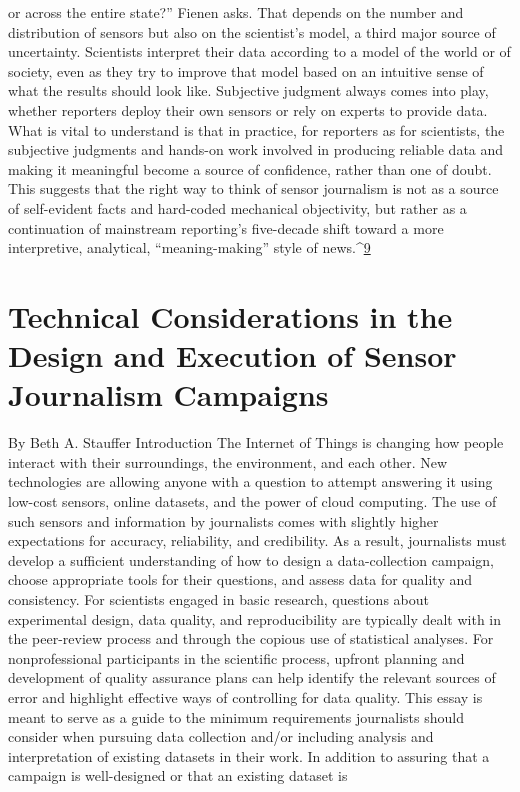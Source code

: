 or across the entire state?'' Fienen asks. That depends on the number and
distribution of sensors but also on the scientist's model, a third major source
of uncertainty. Scientists interpret their data according to a model of the
world or of society, even as they try to improve that model based on an
intuitive sense of what the results should look like.
Subjective judgment always comes into play, whether reporters deploy their
own sensors or rely on experts to provide data. What is vital to understand
is that in practice, for reporters as for scientists, the subjective judgments
and hands-on work involved in producing reliable data and making it meaningful
become a source of confidence, rather than one of doubt. This suggests
that the right way to think of sensor journalism is not as a source of
self-evident facts and hard-coded mechanical objectivity, but rather as a
continuation of mainstream reporting's five-decade shift toward a more
interpretive, analytical, ``meaning-making'' style of news.^{\href{#endnotes-graves}{9}}

\section{Technical Considerations in the Design and Execution of Sensor Journalism Campaigns}
By Beth A. Stauffer
Introduction
The Internet of Things is changing how people interact with their surroundings,
the environment, and each other. New technologies are allowing anyone
with a question to attempt answering it using low-cost sensors, online
datasets, and the power of cloud computing. The use of such sensors and
information by journalists comes with slightly higher expectations for accuracy,
reliability, and credibility. As a result, journalists must develop a sufficient
understanding of how to design a data-collection campaign, choose
appropriate tools for their questions, and assess data for quality and consistency.
For scientists engaged in basic research, questions about experimental
design, data quality, and reproducibility are typically dealt with in
the peer-review process and through the copious use of statistical analyses.
For nonprofessional participants in the scientific process, upfront planning
and development of quality assurance plans can help identify the relevant
sources of error and highlight effective ways of controlling for data quality.
This essay is meant to serve as a guide to the minimum requirements journalists
should consider when pursuing data collection and/or including
analysis and interpretation of existing datasets in their work. In addition
to assuring that a campaign is well-designed or that an existing dataset is

